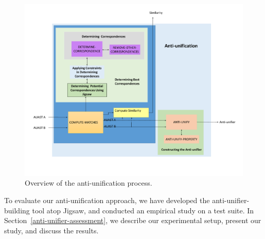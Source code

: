 \begin{figure} [H]
  \centering\includegraphics [width = \textwidth]{Drawing4/overview1.pdf}
  \caption{Overview of the anti-unification process.}
  \label{fig:meth_overview}
\end{figure}

To evaluate our anti-unification approach, we have developed the anti-unifier-building tool atop Jigsaw, and conducted an empirical study on a test suite. In Section~\ref{anti-unifier-assessment}, we describe our experimental setup, present our study, and discuss the results.  





